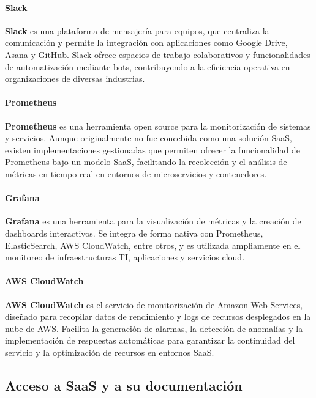 {            \paragraph{Slack} \textbf{Slack} es una plataforma de mensajería para equipos, que centraliza la comunicación y permite la integración con aplicaciones como Google Drive, Asana y GitHub. Slack ofrece espacios de trabajo colaborativos y funcionalidades de automatización mediante bots, contribuyendo a la eficiencia operativa en organizaciones de diversas industrias.
            
            \paragraph{Prometheus} \textbf{Prometheus} es una herramienta open source para la monitorización de sistemas y servicios. Aunque originalmente no fue concebida como una solución SaaS, existen implementaciones gestionadas que permiten ofrecer la funcionalidad de Prometheus bajo un modelo SaaS, facilitando la recolección y el análisis de métricas en tiempo real en entornos de microservicios y contenedores.
            
            \paragraph{Grafana} \textbf{Grafana} es una herramienta para la visualización de métricas y la creación de dashboards interactivos. Se integra de forma nativa con Prometheus, ElasticSearch, AWS CloudWatch, entre otros, y es utilizada ampliamente en el monitoreo de infraestructuras TI, aplicaciones y servicios cloud.
            
            \paragraph{AWS CloudWatch} \textbf{AWS CloudWatch} es el servicio de monitorización de Amazon Web Services, diseñado para recopilar datos de rendimiento y logs de recursos desplegados en la nube de AWS. Facilita la generación de alarmas, la detección de anomalías y la implementación de respuestas automáticas para garantizar la continuidad del servicio y la optimización de recursos en entornos SaaS.
            
        \subsection{Acceso a SaaS y a su documentación}
            
}
